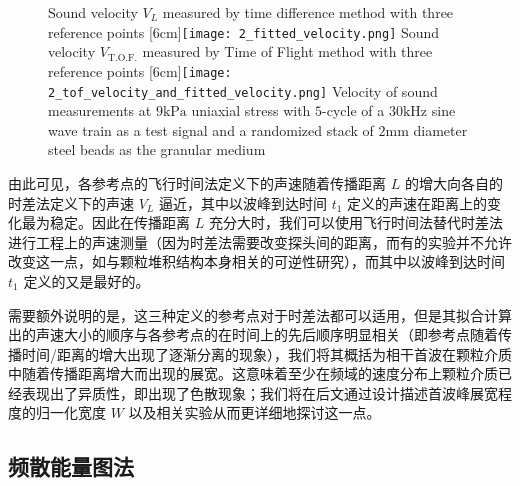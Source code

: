 \begin{figure}[!hbtp]
  \centering
                  {Sound velocity $V_{L}$ measured by time difference method with three reference points}%
                  [6cm]{\texttt{[image: 2\_fitted\_velocity.png]}}
  \hspace{1cm}
                  {Sound velocity $V_{\text{T.O.F.}}$ measured by Time of Flight method with three reference points}%
                  [6cm]{\texttt{[image: 2\_tof\_velocity\_and\_fitted\_velocity.png]}}
            {Velocity of sound measurements at $9\unit{\kilo\Pa}$ uniaxial stress with $5$-cycle of a $30\unit{\kilo\Hz}$ sine wave train as a test signal and a randomized stack of $2\unit{\milli\meter}$ diameter steel beads as the granular medium}
  \label{fig:sound_velocity_measurement}
\end{figure}

由此可见，各参考点的飞行时间法定义下的声速随着传播距离 $L$ 的增大向各自的时差法定义下的声速 $V_{L}$ 逼近，其中以波峰到达时间 $t_{1}$ 定义的声速在距离上的变化最为稳定。因此在传播距离 $L$ 充分大时，我们可以使用飞行时间法替代时差法进行工程上的声速测量（因为时差法需要改变探头间的距离，而有的实验并不允许改变这一点，如与颗粒堆积结构本身相关的可逆性研究\cite{PhysRevE.84.020301}），而其中以波峰到达时间 $t_{1}$ 定义的又是最好的。

需要额外说明的是，这三种定义的参考点对于时差法都可以适用，但是其拟合计算出的声速大小的顺序与各参考点的在时间上的先后顺序明显相关（即参考点随着传播时间/距离的增大出现了逐渐分离的现象），我们将其概括为相干首波在颗粒介质中随着传播距离增大而出现的展宽。这意味着至少在频域的速度分布上颗粒介质已经表现出了异质性，即出现了色散现象；我们将在后文通过设计描述首波峰展宽程度的归一化宽度 $W$ 以及相关实验从而更详细地探讨这一点。


\subsection{频散能量图法}

